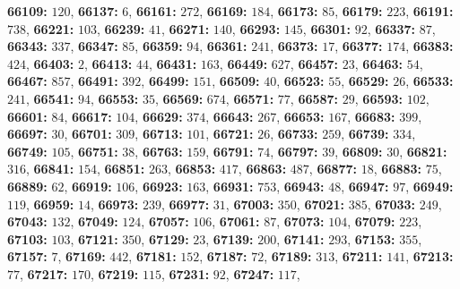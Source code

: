 \textsf{\bfseries 66109:} $120$, \textsf{\bfseries 66137:} $6$, \textsf{\bfseries 66161:} $272$, \textsf{\bfseries 66169:} $184$, \textsf{\bfseries 66173:} $85$, \textsf{\bfseries 66179:} $223$, \textsf{\bfseries 66191:} $738$, \textsf{\bfseries 66221:} $103$, \textsf{\bfseries 66239:} $41$, \textsf{\bfseries 66271:} $140$, \textsf{\bfseries 66293:} $145$, \textsf{\bfseries 66301:} $92$, \textsf{\bfseries 66337:} $87$, \textsf{\bfseries 66343:} $337$, \textsf{\bfseries 66347:} $85$, \textsf{\bfseries 66359:} $94$, \textsf{\bfseries 66361:} $241$, \textsf{\bfseries 66373:} $17$, \textsf{\bfseries 66377:} $174$, \textsf{\bfseries 66383:} $424$, \textsf{\bfseries 66403:} $2$, \textsf{\bfseries 66413:} $44$, \textsf{\bfseries 66431:} $163$, \textsf{\bfseries 66449:} $627$, \textsf{\bfseries 66457:} $23$, \textsf{\bfseries 66463:} $54$, \textsf{\bfseries 66467:} $857$, \textsf{\bfseries 66491:} $392$, \textsf{\bfseries 66499:} $151$, \textsf{\bfseries 66509:} $40$, \textsf{\bfseries 66523:} $55$, \textsf{\bfseries 66529:} $26$, \textsf{\bfseries 66533:} $241$, \textsf{\bfseries 66541:} $94$, \textsf{\bfseries 66553:} $35$, \textsf{\bfseries 66569:} $674$, \textsf{\bfseries 66571:} $77$, \textsf{\bfseries 66587:} $29$, \textsf{\bfseries 66593:} $102$, \textsf{\bfseries 66601:} $84$, \textsf{\bfseries 66617:} $104$, \textsf{\bfseries 66629:} $374$, \textsf{\bfseries 66643:} $267$, \textsf{\bfseries 66653:} $167$, \textsf{\bfseries 66683:} $399$, \textsf{\bfseries 66697:} $30$, \textsf{\bfseries 66701:} $309$, \textsf{\bfseries 66713:} $101$, \textsf{\bfseries 66721:} $26$, \textsf{\bfseries 66733:} $259$, \textsf{\bfseries 66739:} $334$, \textsf{\bfseries 66749:} $105$, \textsf{\bfseries 66751:} $38$, \textsf{\bfseries 66763:} $159$, \textsf{\bfseries 66791:} $74$, \textsf{\bfseries 66797:} $39$, \textsf{\bfseries 66809:} $30$, \textsf{\bfseries 66821:} $316$, \textsf{\bfseries 66841:} $154$, \textsf{\bfseries 66851:} $263$, \textsf{\bfseries 66853:} $417$, \textsf{\bfseries 66863:} $487$, \textsf{\bfseries 66877:} $18$, \textsf{\bfseries 66883:} $75$, \textsf{\bfseries 66889:} $62$, \textsf{\bfseries 66919:} $106$, \textsf{\bfseries 66923:} $163$, \textsf{\bfseries 66931:} $753$, \textsf{\bfseries 66943:} $48$, \textsf{\bfseries 66947:} $97$, \textsf{\bfseries 66949:} $119$, \textsf{\bfseries 66959:} $14$, \textsf{\bfseries 66973:} $239$, \textsf{\bfseries 66977:} $31$, \textsf{\bfseries 67003:} $350$, \textsf{\bfseries 67021:} $385$, \textsf{\bfseries 67033:} $249$, \textsf{\bfseries 67043:} $132$, \textsf{\bfseries 67049:} $124$, \textsf{\bfseries 67057:} $106$, \textsf{\bfseries 67061:} $87$, \textsf{\bfseries 67073:} $104$, \textsf{\bfseries 67079:} $223$, \textsf{\bfseries 67103:} $103$, \textsf{\bfseries 67121:} $350$, \textsf{\bfseries 67129:} $23$, \textsf{\bfseries 67139:} $200$, \textsf{\bfseries 67141:} $293$, \textsf{\bfseries 67153:} $355$, \textsf{\bfseries 67157:} $7$, \textsf{\bfseries 67169:} $442$, \textsf{\bfseries 67181:} $152$, \textsf{\bfseries 67187:} $72$, \textsf{\bfseries 67189:} $313$, \textsf{\bfseries 67211:} $141$, \textsf{\bfseries 67213:} $77$, \textsf{\bfseries 67217:} $170$, \textsf{\bfseries 67219:} $115$, \textsf{\bfseries 67231:} $92$, \textsf{\bfseries 67247:} $117$, 
